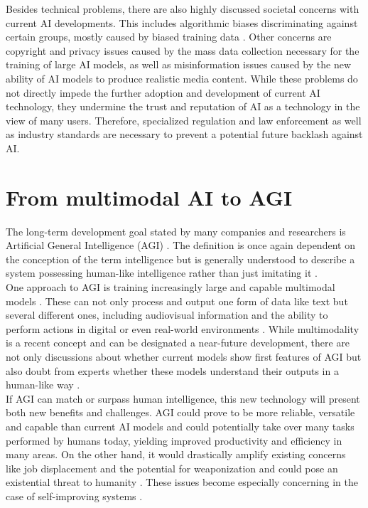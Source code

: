 \documentclass[a4paper, conference]{IEEEtran}
\begin{document}
Besides technical problems, there are also highly discussed societal concerns with current AI developments. This includes algorithmic biases discriminating against certain groups, mostly caused by biased training data \cite[pp. 1812-1818]{aiModernApproach}. Other concerns are copyright \cite{genAiCopyright} and privacy issues \cite[pp. 1807-1812]{aiModernApproach} caused by the mass data collection necessary for the training of large AI models, as well as misinformation issues \cite[p. 55]{littman2022gathering} caused by the new ability of AI models to produce realistic media content. While these problems do not directly impede the further adoption and development of current AI technology, they undermine the trust and reputation of AI as a technology in the view of many users. Therefore, specialized regulation and law enforcement as well as industry standards are necessary to prevent a potential future backlash against AI.\\

\section{From multimodal AI to AGI}
The long-term development goal stated by many companies and researchers is Artificial General Intelligence (AGI) \cite{openAiAgi, googleDeepMindAgi}. The definition is once again dependent on the conception of the term intelligence but is generally understood to describe a system possessing human-like intelligence rather than just imitating it \cite[pp. 88-89]{aiModernApproach}.\\

One approach to AGI is training increasingly large and capable multimodal models \cite{Fei2022}. These can not only process and output one form of data like text but several different ones, including audiovisual information and the ability to perform actions in digital or even real-world environments \cite{baltrušaitis2017multimodal}. While multimodality is a recent concept and can be designated a near-future development, there are not only discussions about whether current models show first features of AGI \cite[pp. 92-95]{bubeck2023sparks} but also doubt from experts whether these models understand their outputs in a human-like way \cite{mahowald2024dissociating}.\\

If AGI can match or surpass human intelligence, this new technology will present both new benefits and challenges. AGI could prove to be more reliable, versatile and capable than current AI models and could potentially take over many tasks performed by humans today, yielding improved productivity and efficiency in many areas. On the other hand, it would drastically amplify existing concerns like job displacement \cite[p. 1821-1826]{aiModernApproach} and the potential for weaponization \cite[1803-1807]{aiModernApproach} and could pose an existential threat to humanity \cite{Turchin2020-TURCOG-2}. These issues become especially concerning in the case of self-improving systems \cite[pp. 1832-1833]{aiModernApproach}.\\
\end{document}

